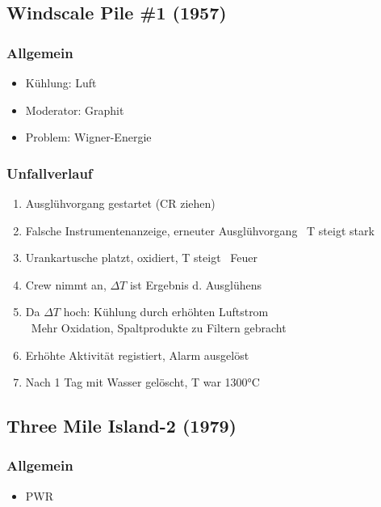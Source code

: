 \documentclass[12pt]{article}
\begin{document}
\subsection{Windscale Pile \#1 (1957)}

\subsubsection{Allgemein}
\begin{itemize}
  \item Kühlung: Luft
  \item Moderator: Graphit
  \item Problem: Wigner-Energie
\end{itemize}

\subsubsection{Unfallverlauf}
\begin{enumerate}
  \item Ausglühvorgang gestartet (CR ziehen)
  \item Falsche Instrumentenanzeige, erneuter Ausglühvorgang \textrightarrow\ T steigt stark
  \item Urankartusche platzt, oxidiert, T steigt \textrightarrow\ Feuer
  \item Crew nimmt an, \(\Delta T\) ist Ergebnis d. Ausglühens
  \item Da \(\Delta T\) hoch: Kühlung durch erhöhten Luftstrom\\
  \textrightarrow\ Mehr Oxidation, Spaltprodukte zu Filtern gebracht
  \item Erhöhte Aktivität registiert, Alarm ausgelöst
  \item Nach 1 Tag mit Wasser gelöscht, T war 1300°C
\end{enumerate}

\subsection{Three Mile Island-2 (1979)}

\subsubsection{Allgemein}
\begin{itemize}
  \item PWR
\end{itemize}
\end{document}
